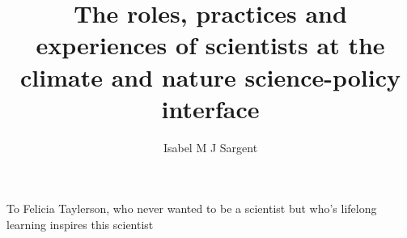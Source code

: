 
\makeatletter
\setlength{\@fptop}{0pt}
\setlength{\@fpbot}{0pt plus 1fil}
\makeatother

\title{The roles, practices and experiences of scientists at the climate and nature science-policy interface}
\author{Isabel M J Sargent}
\raggedbottom
\maketitle

\newpage
To Felicia Taylerson, who never wanted to be a scientist but who's lifelong learning inspires this scientist
\makedeclaration


